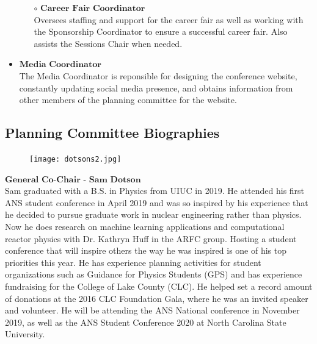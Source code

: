 \begin{itemize}
\begin{itemize}
		\item[$\circ$] $\textbf{Career Fair Coordinator}$\\
		Oversees staffing and support for the career fair as well as working with the Sponsorship
		Coordinator to ensure a successful career fair. Also assists the Sessions Chair when needed.
	\end{itemize}
	\item $\textbf{Media Coordinator}$\\
		The Media Coordinator is reponsible for designing the conference website, constantly updating social media presence,
		and obtains information from other members of the planning committee for the website. 
\end{itemize}

\newpage
\subsection{Planning Committee Biographies}

\setlength\intextsep{0pt}
\begin{figure}
	\begin{center}
		\vspace{-\baselineskip}
		\texttt{[image: dotsons2.jpg]}
	\end{center}
\end{figure}
$\textbf{General Co-Chair - Sam Dotson}$\\
Sam graduated with a B.S. in Physics from UIUC in 2019. He attended his first ANS student conference in April 2019 and was so inspired by his experience that he decided to pursue graduate work in nuclear engineering rather than physics. Now he does research on machine learning applications and computational reactor physics with Dr. Kathryn Huff in the ARFC group. Hosting a student conference that will inspire others the way he was inspired is one of his top priorities this year. He has experience planning activities for student organizations such as Guidance for Physics Students (GPS) and has experience fundraising for the College of Lake County (CLC). He helped set a record amount of donations at the 2016 CLC Foundation Gala, where he was an invited speaker and volunteer. He will be attending the ANS National conference in November 2019, as well as the ANS Student Conference 2020 at North Carolina State University.\\

